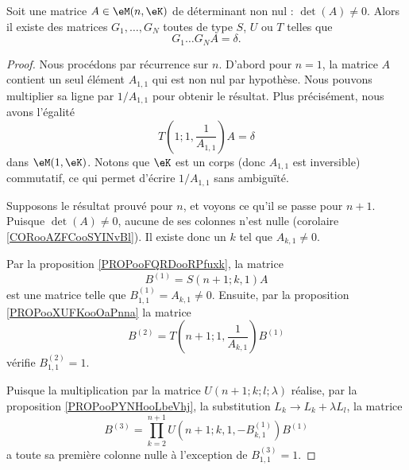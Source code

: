 \begin{proposition}        \label{PROPooJBTZooNLobpf}
	Soit une matrice \( A\in \eM(n,\eK)\) de déterminant non nul : \( \det(A)\neq 0\). Alors il existe des matrices \( G_1,\ldots, G_N\) toutes de type \( S\), \( U\) ou \( T\) telles que
	\begin{equation}
		G_1\ldots G_NA=\delta.
	\end{equation}
\end{proposition}

\begin{proof}
	Nous procédons par récurrence sur \( n\). D'abord pour \( n=1\), la matrice \( A\) contient un seul élément \( A_{1,1}\) qui est non nul par hypothèse. Nous pouvons multiplier sa ligne par \( 1/A_{1,1}\) pour obtenir le résultat. Plus précisément, nous avons l'égalité
	\begin{equation}
		T(1;1,\frac{1}{ A_{1,1} })A=\delta
	\end{equation}
	dans \( \eM(1, \eK)\). Notons que \( \eK\) est un corps (donc \( A_{1,1}\) est inversible) commutatif, ce qui permet d'écrire \( 1/A_{1,1}\) sans ambiguïté.

	Supposons le résultat prouvé pour \( n\), et voyons ce qu'il se passe pour \( n+1\). Puisque \( \det(A)\neq 0\), aucune de ses colonnes n'est nulle (corolaire \ref{CORooAZFCooSYINvBl}). Il existe donc un \( k\) tel que \( A_{k,1}\neq 0\).

	Par la proposition \ref{PROPooFQRDooRPfuxk}, la matrice
	\begin{equation}
		B^{(1)}=S(n+1;k,1)A
	\end{equation}
	est une matrice telle que \( B^{(1)}_{1,1}=A_{k,1}\neq 0\). Ensuite, par la proposition \ref{PROPooXUFKooOaPnna} la matrice
	\begin{equation}
		B^{(2)}=T(n+1;1,\frac{1}{ A_{k,1} })B^{(1)}
	\end{equation}
	vérifie \( B^{(2)}_{1,1}=1\).

	Puisque la multiplication par la matrice \( U(n+1;k;l;\lambda)\) réalise, par la proposition \ref{PROPooPYNHooLbeVhj}, la substitution \( L_k\to L_{k}+\lambda L_l\), la matrice
	\begin{equation}
		B^{(3)}=\prod_{k=2}^{n+1} U(n+1;k,1,-B^{(1)}_{k,1})B^{(1)}
	\end{equation}
	a toute sa première colonne nulle à l'exception de \( B^{(3)}_{1,1}=1\).


\end{proof}
